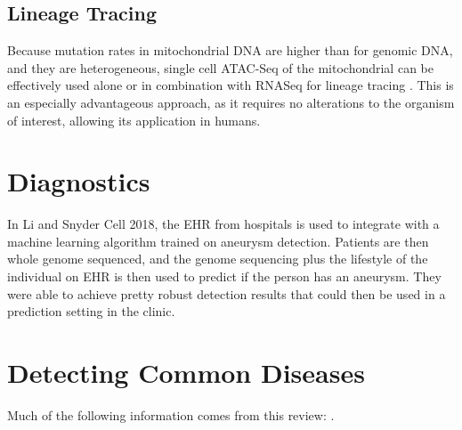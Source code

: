 \documentclass[]{book}
\begin{document}
\subsection{Lineage Tracing}\label{lineage-tracing}

Because mutation rates in mitochondrial DNA are higher than for genomic
DNA, and they are heterogeneous, single cell ATAC-Seq of the
mitochondrial can be effectively used alone or in combination with
RNASeq for lineage tracing \citep{ludwig2019lineage}. This is an
especially advantageous approach, as it requires no alterations to the
organism of interest, allowing its application in humans.

\section{Diagnostics}\label{diagnostics}

In Li and Snyder Cell 2018, the EHR from hospitals is used to integrate
with a machine learning algorithm trained on aneurysm detection.
Patients are then whole genome sequenced, and the genome sequencing plus
the lifestyle of the individual on EHR is then used to predict if the
person has an aneurysm. They were able to achieve pretty robust
detection results that could then be used in a prediction setting in the
clinic.

\section{Detecting Common Diseases}\label{detecting-common-diseases}

Much of the following information comes from this review:
\citep{shendure2019genomic}.
\end{document}
